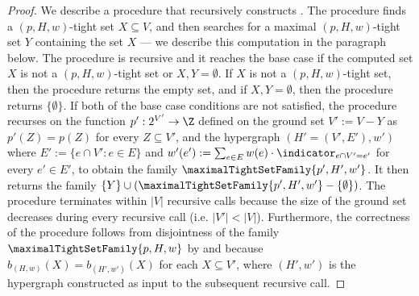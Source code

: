 \lemComputingMaximalTightSetFamily*
\begin{proof}
We describe a procedure that recursively constructs . The procedure finds a $(p, H, w)$-tight set $X\subseteq V$, and then searches for a maximal $(p, H, w)$-tight set $Y$ containing the set $X$ --- we describe this computation in the paragraph below. 
The procedure is recursive and it reaches the base case if 
the computed set $X$ is not a $(p, H, w)$-tight set or $X,Y = \emptyset$. If $X$ is not a $(p, H, w)$-tight set, then the procedure returns the empty set, and if $X,Y = \emptyset$, then the procedure returns $\{\emptyset\}$.
If both of the base case conditions are not satisfied, the procedure recurses on the function $p':2^{V'}\rightarrow\Z$ defined on the ground set $V':=V - Y$ as $p'(Z) = p(Z)$ for every $Z \subseteq V'$, and the hypergraph $(H' = (V', E'), w')$ where $E' := \{e \cap V' : e \in E\}$ and $w'(e'):= \sum_{e \in E}w(e)\cdot\indicator_{e\cap V' = e'}$ for every $e' \in E'$, to obtain the family $\maximalTightSetFamily{p', H', w'}$.
It then returns the family $\{Y\} \cup (\maximalTightSetFamily{p', H', w'} - \{\emptyset\})$. 
The procedure terminates within $|V|$ recursive calls because the size of the ground set decreases during every recursive call (i.e. $|V'| < |V|$). Furthermore, the correctness of the procedure follows from disjointness of the family $\maximalTightSetFamily{p, H, w}$ by  and because $b_{(H,w)}(X) = b_{(H', w')}(X)$ for each $X \subseteq V'$, where $(H', w')$ is the hypergraph constructed as input to the subsequent recursive call.
    

\end{proof}
